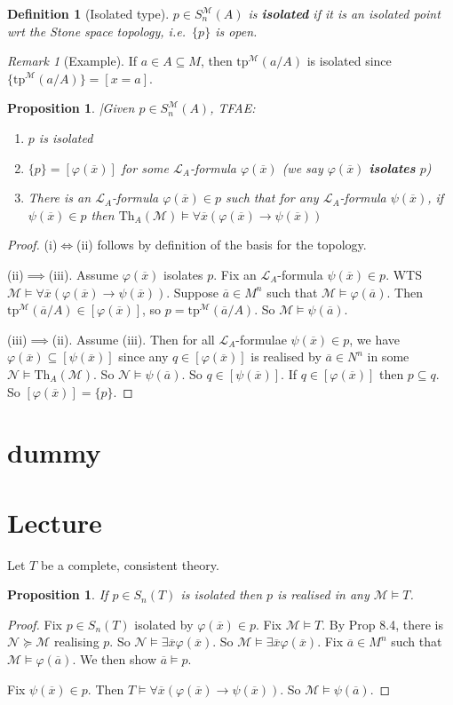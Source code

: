 \documentclass[]{article}
\theoremstyle{custhm}
\theoremstyle{cusdef}
\newtheorem{defin}[theorem]{Definition}
\theoremstyle{custhm}
\theoremstyle{custhm}
\theoremstyle{custhm}
\newtheorem{prop}[theorem]{Proposition}
\theoremstyle{ex}
\theoremstyle{custhm}
\theoremstyle{cusdef}
\theoremstyle{remark}
\newtheorem*{remark*}{Remark}
\theoremstyle{remark}
\theoremstyle{numremark}
\newcommand{\ra}{\rightarrow}
\newcommand{\ie}{\textit{i.e.}}
\newcommand{\undf}[1]{\textit{\textbf{#1}}}
\renewcommand{\L}{\mathcal{L}}
\newcommand{\M}{\mathcal{M}}
\renewcommand{\phi}{\varphi}
\renewcommand{\bar}{\overline}
\newcommand{\Th}{\textrm{Th}}
\newcommand{\tp}{\textrm{tp}}
\newcommand{\N}{\mathcal{N}}
\newcommand{\sman}{S_n^\M(A)}
\renewcommand{\subset}{\subseteq}
\begin{document}
\begin{defin}[Isolated type]
$p\in \sman$ is \undf{isolated} if it is an isolated point wrt the Stone space topology, \ie\ $\{p\}$ is open.
\end{defin}
\begin{remark*}[Example]
If $a\in A\subset M$, then $\tp^\M(a/A)$ is isolated since $\{\tp^\M(a/A)\} = [x = a]$.
\end{remark*}
\begin{prop}
|Given $p\in \sman$, TFAE:
\begin{enumerate}[label=\roman*)]
	\item $p$ is isolated
	\item $\{p\} = [\phi(\bar{x})]$ for some $\L_A$-formula $\phi(\bar{x})$ (we say $\phi(\bar{x})$ \undf{isolates} $p$)
	\item There is an $\L_A$-formula $\phi(\bar{x})\in p$ such that for any $\L_A$-formula $\psi(\bar{x})$, if $\psi(\bar{x})\in p$ then $\Th_A(\M)\models \forall \bar{x}(\phi(\bar{x})\ra\psi(\bar{x}))$
\end{enumerate}
\end{prop}
\begin{proof}
(i)$\iff$(ii) follows by definition of the basis for the topology.

(ii)$\implies$(iii). Assume $\phi(\bar{x})$ isolates $p$. Fix an $\L_A$-formula $\psi(\bar{x})\in p$. WTS $\M\models \forall \bar{x}(\phi(\bar{x})\ra\psi(\bar{x}))$. Suppose $\bar{a}\in M^n$ such that $\M\models \phi(\bar{a})$. Then $\tp^\M(\bar{a}/A)\in [\phi(\bar{x})]$, so $p = \tp^\M(\bar{a}/A)$. So $\M\models \psi(\bar{a})$.

(iii)$\implies$(ii). Assume (iii). Then for all $\L_A$-formulae $\psi(\bar{x})\in p$, we have $\phi(\bar{x})\subset[\psi(\bar{x})]$ since any $q \in [\phi(\bar{x})]$ is realised by $\bar{a} \in N^n$ in some $\N\models \Th_A(\M)$. So $\N\models \psi(\bar{a})$. So $q \in [\psi(\bar{x})]$. If $q \in [\phi(\bar{x})]$ then $p\subset q$. So $[\phi(\bar{x})] = \{p\}$.
\end{proof} 
\section{dummy}
\section{Lecture}

Let $T$ be a complete, consistent theory.

\begin{prop}
If $p \in S_n(T)$ is isolated then $p$ is realised in any $\M\models T$.
\end{prop}
\begin{proof}
Fix $p \in S_n(T)$ isolated by $\phi(\bar{x})\in p$. Fix $\M\models T$. By Prop 8.4, there is $\N\succeq \M$ realising $p$. So $\N\models \exists \bar{x}\phi(\bar{x})$. So $\M\models \exists \bar{x}\phi(\bar{x})$. Fix $\bar{a}\in M^n$ such that $\M\models \phi(\bar{a})$. We then show $\bar{a}\models p$.

Fix $\psi(\bar{x})\in p$. Then $T\models \forall \bar{x}(\phi(\bar{x})\ra\psi(\bar{x}))$. So $\M\models \psi(\bar{a})$.
\end{proof}
\end{document}
